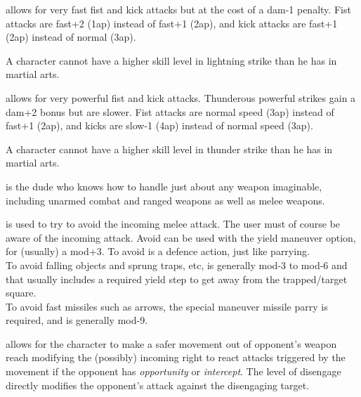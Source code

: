  allows for very fast fist and kick attacks but at the cost of a dam-1 penalty. Fist attacks are fast+2 (1ap) instead of fast+1 (2ap), and kick attacks are fast+1 (2ap) instead of normal (3ap).

A character cannot have a higher skill level in lightning strike than he has in martial arts.

 allows for very powerful fist and kick attacks.  Thunderous powerful strikes gain a dam+2 bonus but are slower. Fist attacks are normal speed (3ap) instead of fast+1 (2ap), and kicks are slow-1 (4ap) instead of normal speed (3ap).

A character cannot have a higher skill level in thunder strike than he has in martial arts.


 is the dude who knows how to handle just about any weapon imaginable, including unarmed combat and ranged weapons as well as melee weapons.


 is used to try to avoid the incoming melee attack. The user must of course be aware of the incoming attack. Avoid can be used with the yield maneuver option, for (usually) a mod+3. To avoid is a defence action, just like parrying. \\
To avoid falling objects and sprung traps, etc, is generally mod-3 to mod-6 and that usually includes a required yield step to get away from the trapped/target square. \\
To avoid fast missiles such as arrows, the special maneuver missile parry is required, and is generally mod-9.


 allows for the character to make a safer movement out of opponent's weapon reach modifying the (possibly) incoming right to react attacks triggered by the movement if the opponent has \emph{opportunity} or \emph{intercept}. The level of disengage directly modifies the opponent's attack against the disengaging target.



